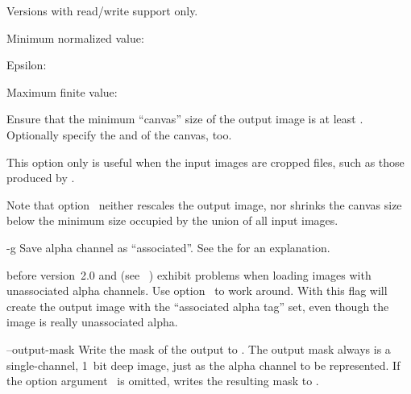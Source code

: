 \begin{codelist}
\begin{restrictedmaterial}{Versions with  read\slash write support only.}
    \begin{compactitemize}
    \item
      Minimum normalized value: 
    \item
      Epsilon: 
    \item
      Maximum finite value: 
    \end{compactitemize}
  \end{restrictedmaterial}

  \label{opt:f}%
\item[-f \metavar{WIDTH}x\metavar{HEIGHT}%
  \optional{+x\metavar{XOFFSET}+y\metavar{YOFFSET}}]\itemend
  Ensure that the minimum ``canvas'' size of the output image is at least
  \classictimes{}.  Optionally specify the  and
   of the canvas, too.

  This option only is useful when the input images are cropped  files, such as
  those produced by .

  Note that option~ neither rescales the output image, nor shrinks the canvas size
  below the minimum size occupied by the union of all input images.


  \label{opt:g}%
\item[-g]
  Save alpha channel as ``associated''.  See the
   for an explanation.

   before version~2.0 and  (see
  \appendixName~) exhibit problems when loading images with
  unassociated alpha channels.  Use option~ to work around.  With this flag \App{}
  will create the output image with the ``associated alpha tag'' set, even though the image is
  really unassociated alpha.


  \label{opt:output-mask}%
\item[--output-mask\optional{=\metavar{FILE}}]\itemend
  Write the mask of the output to .  The output mask always is a single-channel,
  1~bit deep image, just as the alpha channel to be represented.  If the option
  argument~ is omitted, \App{} writes the resulting mask to
  .


\end{codelist}
